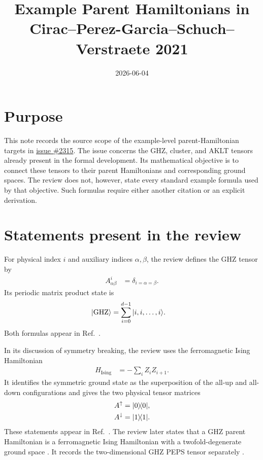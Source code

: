 \documentclass{article}
\title{Example Parent Hamiltonians in Cirac--Perez-Garcia--Schuch--Verstraete 2021}
\author{}
\date{2026-06-04}
\begin{document}
\maketitle
{}

\section{Purpose}

This note records the source scope of the example-level parent-Hamiltonian
targets in \href{https://github.com/LionSR/TNLean/issues/2315}{issue \#2315}.
The issue concerns the GHZ, cluster, and AKLT tensors already present in the
formal development. Its mathematical objective is to connect these tensors to
their parent Hamiltonians and corresponding ground spaces. The review does not,
however, state every standard example formula used by that objective. Such
formulas require either another citation or an explicit derivation.

\section{Statements present in the review}

For physical index $i$ and auxiliary indices $\alpha,\beta$, the review defines
the GHZ tensor by
\begin{align}
    A^i_{\alpha\beta}
        &=
        \delta_{i=\alpha=\beta}.
    \label{eq:rmp_example_parent_hamiltonian_scope_ghz_tensor}
\end{align}
Its periodic matrix product state is
\begin{align}
    |\mathrm{GHZ}\rangle
        &=
        \sum_{i=0}^{d-1}|i,i,\ldots,i\rangle.
    \label{eq:rmp_example_parent_hamiltonian_scope_ghz_state}
\end{align}
Both formulas appear in Ref.~\cite[lines~2341--2345]{Cirac2021Matrix}.

In its discussion of symmetry breaking, the review uses the ferromagnetic Ising
Hamiltonian
\begin{align}
    H_{\mathrm{Ising}}
        &=
        -\sum_i Z_iZ_{i+1}.
    \label{eq:rmp_example_parent_hamiltonian_scope_ising_hamiltonian}
\end{align}
It identifies the symmetric ground state as the superposition of the all-up and
all-down configurations and gives the two physical tensor matrices
\begin{align}
    A^\uparrow
        &=
        |0\rangle\!\langle 0|,
    \label{eq:rmp_example_parent_hamiltonian_scope_ghz_up_matrix}\\
    A^\downarrow
        &=
        |1\rangle\!\langle 1|.
    \label{eq:rmp_example_parent_hamiltonian_scope_ghz_down_matrix}
\end{align}
These statements appear in Ref.~\cite[lines~1194--1196]{Cirac2021Matrix}. The
review later states that a GHZ parent Hamiltonian is a ferromagnetic Ising
Hamiltonian with a twofold-degenerate ground space
\cite[line~2205]{Cirac2021Matrix}. It records the two-dimensional GHZ PEPS
tensor separately \cite[lines~2417--2421]{Cirac2021Matrix}.
\end{document}
